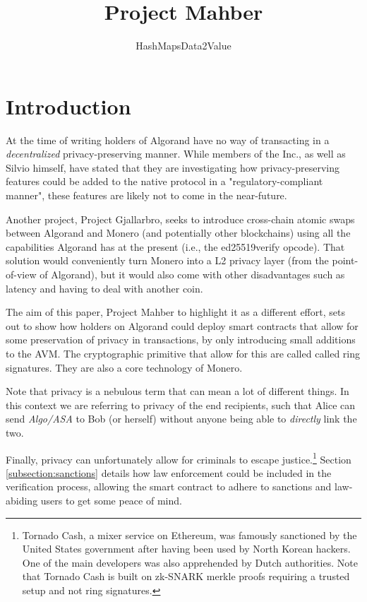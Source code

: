 \documentclass[9pt]{article}
\title{Project Mahber}
\author{HashMapsData2Value}
\begin{document}
\maketitle

\tableofcontents

\newpage

\section{Introduction}

At the time of writing holders of Algorand have no way of transacting in a \textit{decentralized} privacy-preserving manner. While members of the Inc., as well as Silvio himself, have stated that they are investigating how privacy-preserving features could be added to the native protocol in a "regulatory-compliant manner", these features are likely not to come in the near-future.

Another project, Project Gjallarbro, seeks to introduce cross-chain atomic swaps between Algorand and Monero (and potentially other blockchains) using all the capabilities Algorand has at the present (i.e., the ed25519verify opcode). That solution would conveniently turn Monero into a L2 privacy layer (from the point-of-view of Algorand), but it would also come with other disadvantages such as latency and having to deal with another coin.

The aim of this paper, Project Mahber to highlight it as a different effort, sets out to show how holders on Algorand could deploy smart contracts that allow for some preservation of privacy in transactions, by only introducing small additions to the AVM. The cryptographic primitive that allow for this are called called ring signatures. They are also a core technology of Monero.

Note that privacy is a nebulous term that can mean a lot of different things. In this context we are referring to privacy of the end recipients, such that Alice can send \textit{Algo/ASA} to Bob (or herself) without anyone being able to \textit{directly} link the two.

Finally, privacy can unfortunately allow for criminals to escape justice.\footnote{Tornado Cash, a mixer service on Ethereum, was famously sanctioned by the United States government after having been used by North Korean hackers. One of the main developers was also apprehended by Dutch authorities. Note that Tornado Cash is built on zk-SNARK merkle proofs requiring a trusted setup and not ring signatures.} Section \ref{subsection:sanctions} details how law enforcement could be included in the verification process, allowing the smart contract to adhere to sanctions and law-abiding users to get some peace of mind.
\end{document}
